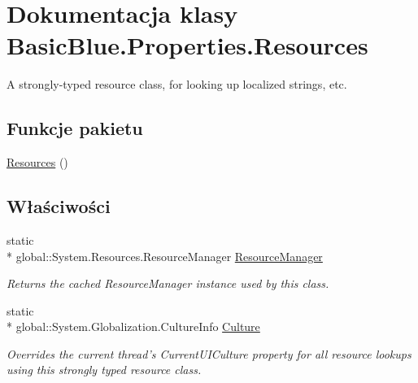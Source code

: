 \hypertarget{class_basic_blue_1_1_properties_1_1_resources}{\section{Dokumentacja klasy Basic\-Blue.\-Properties.\-Resources}
\label{class_basic_blue_1_1_properties_1_1_resources}
}


A strongly-\/typed resource class, for looking up localized strings, etc.  


\subsection*{Funkcje pakietu}
\begin{DoxyCompactItemize}
\item 
\hyperlink{class_basic_blue_1_1_properties_1_1_resources_a400b6c8fae2286e267f826c252ef5d12}{Resources} ()
\end{DoxyCompactItemize}
\subsection*{Właściwości}
\begin{DoxyCompactItemize}
\item 
static \\*
global\-::\-System.\-Resources.\-Resource\-Manager \hyperlink{class_basic_blue_1_1_properties_1_1_resources_a8a26a2744c986299a8d32baa0f4303fe}{Resource\-Manager}
\begin{DoxyCompactList}\small\item\em Returns the cached Resource\-Manager instance used by this class. \end{DoxyCompactList}\item 
static \\*
global\-::\-System.\-Globalization.\-Culture\-Info \hyperlink{class_basic_blue_1_1_properties_1_1_resources_ab550a13a4784e500d0181ad0f9ed96c3}{Culture}
\begin{DoxyCompactList}\small\item\em Overrides the current thread's Current\-U\-I\-Culture property for all resource lookups using this strongly typed resource class. \end{DoxyCompactList}\end{DoxyCompactItemize}
